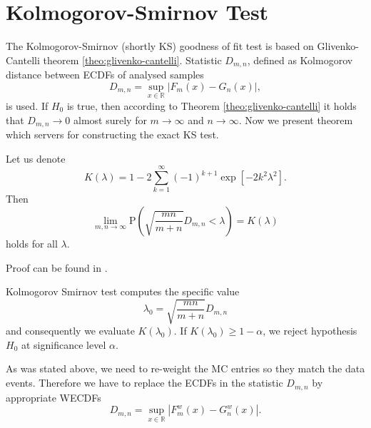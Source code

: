 \section{Kolmogorov-Smirnov Test}
The Kolmogorov-Smirnov (shortly KS) goodness of fit test is based on Glivenko-Cantelli theorem \ref{theo:glivenko-cantelli}. Statistic $D_{m,n}$, defined as Kolmogorov distance between ECDFs of analysed samples
\begin{equation}
D_{m,n} = \sup_{x \in \mathbb{R}} |F_m(x) - G_n(x)|,
\end{equation}
is used. If $H_0$ is true, then according to Theorem \ref{theo:glivenko-cantelli} it holds that $D_{m,n} \rightarrow 0$ almost surely for $m \rightarrow \infty$ and $n \rightarrow \infty$. Now we present theorem which servers for constructing the exact KS test.
\begin{theorem}[Smirnov]
	Let us denote  
	\begin{equation}
	K(\lambda) = 1 - 2\sum_{k=1}^{\infty} (-1)^{k+1} \exp\left[ -2k^2\lambda^2\right].
	\end{equation}
	Then 
	\begin{equation}
	\lim_{m,n \rightarrow \infty} \mathrm{P}\left(\sqrt{\frac{mn}{m+n}}D_{m,n} < \lambda \right) = K(\lambda)
	\end{equation}
	holds for all $\lambda$.
\end{theorem}
\noindent Proof can be found in \cite{Smirnov1944}. 

\noindent Kolmogorov Smirnov test computes the specific value
\[\lambda_0 = \sqrt{\frac{mn}{m+n}}D_{m,n}\] and consequently we evaluate  $K\left( \lambda_0 \right)$. If $K\left( \lambda_0 \right) \geq 1 - \alpha$, we reject hypothesis $H_0$ at significance level $\alpha$.

As was stated above, we need to re-weight the MC entries so they match the data events. Therefore we have to replace the ECDFs in the statistic $D_{m,n}$ by appropriate WECDFs
\begin{equation}
D_{m,n} = \sup_{x \in \mathbb{R}} |F^w_m(x) - G^w_n(x)|.
\end{equation}

